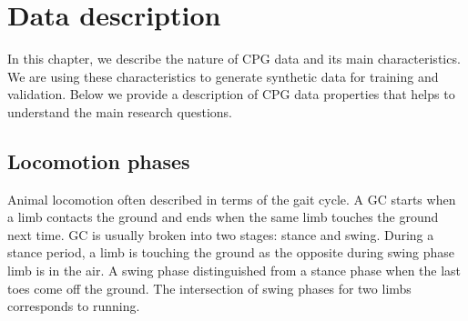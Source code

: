 
\chapter{Data description}

In this chapter, we describe the nature of CPG data and its main characteristics. We are using these characteristics to generate synthetic data for training and validation. Below we provide a description of CPG data properties that helps to understand the main research questions.
 
\section{Locomotion phases}

Animal locomotion often described in terms of the gait cycle. A GC starts when a limb contacts the ground and ends when the same limb touches the ground next time. GC is usually broken into two stages: stance and swing. During a stance period, a limb is touching the ground as the opposite during swing phase limb is in the air. A swing phase distinguished from a stance phase when the last toes come off the ground. The intersection of swing phases for two limbs corresponds to running. 

\endinput